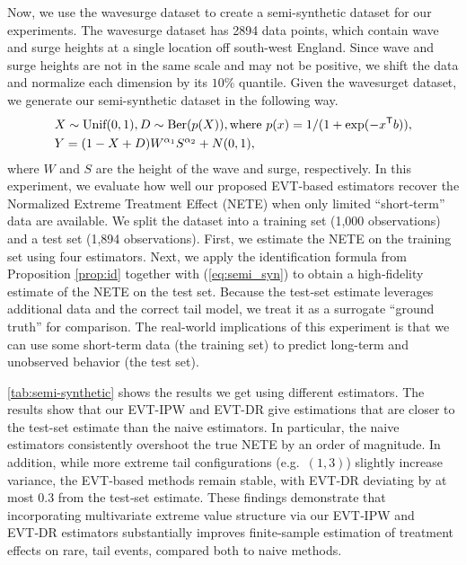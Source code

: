 \documentclass[12pt]{article}
\theoremstyle{plain}
\theoremstyle{definition}
\begin{document}
Now, we use the wavesurge dataset \cite{coles2001introduction} to create a semi-synthetic dataset for our experiments. The wavesurge dataset has 2894 data points, which contain wave and surge heights at a single location off south-west England. Since wave and surge heights are not in the same scale and may not be positive, we shift the data and normalize each dimension by its $ 10 \% $ quantile. Given the wavesurget dataset, we generate our semi-synthetic dataset in the following way. 
\begin{align}
    & X \sim \text{Unif}(0,1), D \sim \text{Ber}(p(X)), \text{where} \  p(x) = 1/(1 + \exp(-x^\mathsf{T} b)), \notag\\
    & Y = (1 -  X + D)W^{\alpha_1} S^{\alpha_2} +  N(0,1), \label{eq:semi_syn}
\end{align}
where $ W $ and $ S $ are the height of the wave and surge, respectively. In this experiment, we evaluate how well our proposed EVT‑based estimators recover the Normalized Extreme Treatment Effect (NETE) when only limited “short‑term” data are available. We split the dataset into a training set (1,000 observations) and a test set (1,894 observations). First, we estimate the NETE on the training set using four estimators. Next, we apply the identification formula from Proposition \ref{prop:id} together with (\ref{eq:semi_syn}) to obtain a high‑fidelity estimate of the NETE on the test set. Because the test‑set estimate leverages additional data and the correct tail model, we treat it as a surrogate “ground truth” for comparison.  The real-world implications of this experiment is that we can use some short-term data (the training set) to predict long-term and unobserved behavior (the test set). 

\cref{tab:semi-synthetic} shows the results we get using different estimators. The results show that our EVT-IPW and EVT-DR give estimations that are closer to the test-set estimate than the naive estimators. In particular, the naive estimators consistently overshoot the true NETE by an order of magnitude. In addition, while more extreme tail configurations (e.g.\ $(1,3)$) slightly increase variance, the EVT‑based methods remain stable, with EVT‑DR deviating by at most 0.3 from the test‑set estimate.  These findings demonstrate that incorporating multivariate extreme value structure via our EVT‑IPW and EVT‑DR estimators substantially improves finite‑sample estimation of treatment effects on rare, tail events, compared both to naive methods. 
\end{document}
